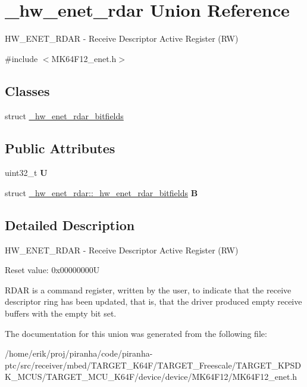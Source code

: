 \hypertarget{union__hw__enet__rdar}{}\section{\+\_\+hw\+\_\+enet\+\_\+rdar Union Reference}
\label{union__hw__enet__rdar}


H\+W\+\_\+\+E\+N\+E\+T\+\_\+\+R\+D\+AR -\/ Receive Descriptor Active Register (RW)  




{\ttfamily \#include $<$M\+K64\+F12\+\_\+enet.\+h$>$}

\subsection*{Classes}
\begin{DoxyCompactItemize}
\item 
struct \hyperlink{struct__hw__enet__rdar_1_1__hw__enet__rdar__bitfields}{\+\_\+hw\+\_\+enet\+\_\+rdar\+\_\+bitfields}
\end{DoxyCompactItemize}
\subsection*{Public Attributes}
\begin{DoxyCompactItemize}
\item 
uint32\+\_\+t {\bfseries U}\hypertarget{union__hw__enet__rdar_afd03c335562cac50a4e978d1cd9fc2a5}{}\label{union__hw__enet__rdar_afd03c335562cac50a4e978d1cd9fc2a5}

\item 
struct \hyperlink{struct__hw__enet__rdar_1_1__hw__enet__rdar__bitfields}{\+\_\+hw\+\_\+enet\+\_\+rdar\+::\+\_\+hw\+\_\+enet\+\_\+rdar\+\_\+bitfields} {\bfseries B}\hypertarget{union__hw__enet__rdar_a25ab74d84881ef9eb83fca609cc81485}{}\label{union__hw__enet__rdar_a25ab74d84881ef9eb83fca609cc81485}

\end{DoxyCompactItemize}


\subsection{Detailed Description}
H\+W\+\_\+\+E\+N\+E\+T\+\_\+\+R\+D\+AR -\/ Receive Descriptor Active Register (RW) 

Reset value\+: 0x00000000U

R\+D\+AR is a command register, written by the user, to indicate that the receive descriptor ring has been updated, that is, that the driver produced empty receive buffers with the empty bit set. 

The documentation for this union was generated from the following file\+:\begin{DoxyCompactItemize}
\item 
/home/erik/proj/piranha/code/piranha-\/ptc/src/receiver/mbed/\+T\+A\+R\+G\+E\+T\+\_\+\+K64\+F/\+T\+A\+R\+G\+E\+T\+\_\+\+Freescale/\+T\+A\+R\+G\+E\+T\+\_\+\+K\+P\+S\+D\+K\+\_\+\+M\+C\+U\+S/\+T\+A\+R\+G\+E\+T\+\_\+\+M\+C\+U\+\_\+\+K64\+F/device/device/\+M\+K64\+F12/M\+K64\+F12\+\_\+enet.\+h\end{DoxyCompactItemize}
